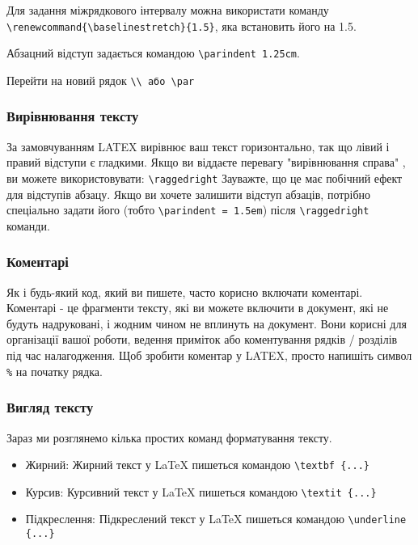 Для задання міжрядкового інтервалу можна використати команду \verb|\renewcommand{\baselinestretch}{1.5}|, яка встановить його на 1.5.

Абзацний відступ задається командою \verb|\parindent 1.25cm|.\par Перейти на новий рядок \verb|\\ або \par|

\subsubsection{Вирівнювання тексту}

За замовчуванням LATEX вирівнює ваш текст горизонтально, так що лівий і правий відступи є гладкими. Якщо ви віддаєте перевагу "вирівнювання справа" , ви можете використовувати:
\verb|\raggedright|
Зауважте, що це має побічний ефект для відступів абзацу. Якщо ви хочете залишити відступ абзаців, потрібно спеціально задати його (тобто \verb|\parindent = 1.5em|) після \verb|\raggedright| команди.

\subsubsection{Коментарі}

Як і будь-який код, який ви пишете, часто корисно включати коментарі. Коментарі - це фрагменти тексту, які ви можете включити в документ, які не будуть надруковані, і жодним чином не вплинуть на документ. Вони корисні для організації вашої роботи, ведення приміток або коментування рядків / розділів під час налагодження. Щоб зробити коментар у LATEX, просто напишіть символ \verb|%| на початку рядка.

\subsubsection{Вигляд тексту}

Зараз ми розглянемо кілька простих команд форматування тексту.

\begin{itemize}
	\item Жирний: Жирний текст у LaTeX пишеться командою \verb|\textbf {...}|
	\item Курсив: Курсивний текст у LaTeX пишеться командою \verb|\textit {...}|
	\item Підкреслення: Підкреслений текст у LaTeX пишеться командою \verb|\underline {...}|
\end{itemize}

